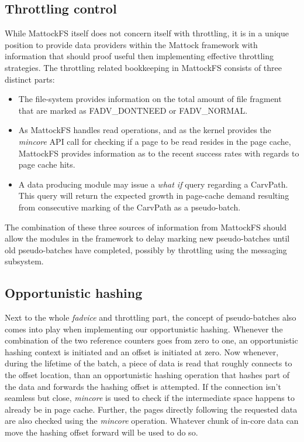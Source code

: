 \subsection{Throttling control}
While MattockFS itself does not concern itself with throttling, it is in a unique position to provide data providers within the Mattock framework with information that should proof useful then implementing effective throttling strategies. The throttling related bookkeeping in MattockFS consists of three distinct parts:
\begin{itemize}
\item The file-system provides information on the total amount of file fragment that are marked as FADV\_DONTNEED or FADV\_NORMAL.
\item As MattockFS handles read operations, and as the kernel provides the \emph{mincore} API call for checking if a page to be read resides in the page cache, MattockFS provides information as to the recent success rates with regards to page cache hits.
\item A data producing module may issue a \emph{what if} query regarding a CarvPath. This query will return the expected growth in page-cache demand resulting from consecutive marking of the CarvPath as a pseudo-batch.
\end{itemize}
The combination of these three sources of information from MattockFS should allow the modules in the framework to delay marking new pseudo-batches until old pseudo-batches have completed, possibly by throttling using the messaging subsystem.
\subsection{Opportunistic hashing}
Next to the whole \emph{fadvice} and throttling part, the concept of pseudo-batches also comes into play when implementing our opportunistic hashing. Whenever the combination of the two reference counters goes from zero to one, an opportunistic hashing context is initiated and an offset is initiated at zero. Now whenever, during the lifetime of the batch, a piece of data is read that roughly connects to the offset location, than an opportunistic hashing operation that hashes part of the data and forwards the hashing offset is attempted. If the connection isn't seamless but close, \emph{mincore} is used to check if the intermediate space happens to already be in page cache. Further, the pages directly following the requested data are also checked using the \emph{mincore} operation. Whatever chunk of in-core data can move the hashing offset forward will be used to do so.
